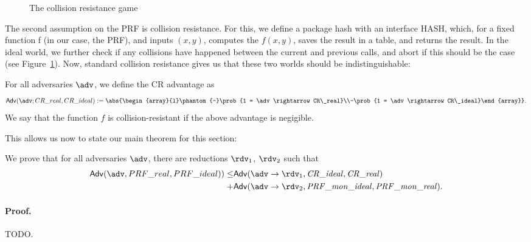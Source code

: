 \begin{figure}
 \centering
 
 \caption{The collision resistance game}
 \label{fig:CR_hash}
\end{figure}

The second assumption on the PRF is collision resistance. For this, we define a package hash with an interface HASH, which, for a fixed function f (in our case, the PRF), and inputs $(x,y)$, computes the $f(x,y)$, saves the result in a table, and returns the result. In the ideal world, we further check if any collisions have happened between the current and previous calls, and abort if this should be the case (see Figure~\ref{fig:CR_hash}). Now, standard collision resistance gives us that these two worlds should be indistinguishable:

\begin{definition}[CR]
\label{advantage:assumption:CR:CR_real:CR_ideal}
For all adversaries $\adv$, we define the CR advantage as\[\mathsf{Adv}(\adv;CR\_real,CR\_ideal):=\abs{\begin{array}{l}\phantom{-}\prob{1 = \adv\rightarrow CR\_real}\\-\prob{1 = \adv\rightarrow CR\_ideal}\end{array}}.
\]
We say that the function $f$ is collision-resistant if the above advantage is negigible.
\end{definition}

This allows us now to state our main theorem for this section:

\begin{theorem}[Main]
We prove that for all adversaries $\adv$, there are reductions $\rdv_{1}$, $\rdv_{2}$ such that \begin{align*}\mathsf{Adv}(\adv, PRF\_real, PRF\_ideal)) \leq &\mathsf{Adv}(\adv\rightarrow\rdv_{1},\mathit{CR\_ideal},\mathit{CR\_real}) \\+ &\mathsf{Adv}(\adv\rightarrow\rdv_{2},\mathit{PRF\_mon\_ideal},\mathit{PRF\_mon\_real}).\end{align*} %
\end{theorem}

\paragraph{Proof.} {\color{blue} TODO.}

